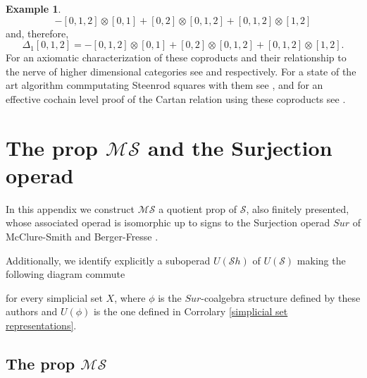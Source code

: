 \documentclass{amsart}
\renewcommand{\S}{\mathcal{S}}
\newcommand{\MS}{\mathcal{MS}}
\newcommand{\Sh}{\mathcal{S}h}
\newcommand{\F}{\mathbb{F}}
\newcommand{\chains}{\mathrm{C}_\bullet}
\newcommand{\tensor}{\otimes}
\newcommand{\End}{\mathrm{End}}
\theoremstyle{definition}
\newtheorem{example}[theorem]{Example}
\begin{document}
\begin{example}
		$$-[0,1,2]\tensor[0,1]+[0,2]\tensor[0,1,2]+[0,1,2]\tensor[1,2]$$
		and, therefore,
		$$\Delta_1[0,1,2]=-[0,1,2]\tensor[0,1]+[0,2]\tensor[0,1,2]+[0,1,2]\tensor[1,2].$$
		For an axiomatic characterization of these coproducts and their relationship to the nerve of higher dimensional categories see \cite{medina2018axiomatic} and \cite{medina2019globular} respectively. For a state of the art algorithm commputating Steenrod squares with them see \cite{medina2018persistence}, and for an effective cochain level proof of the Cartan relation using these coproducts see \cite{medina2019effective}.
	\end{example}
	
	\appendix
	
	\section{The prop $\MS$ and the Surjection operad}
	
	In this appendix we construct $\MS$ a quotient prop of $\S$, also finitely presented, whose associated operad is isomorphic up to signs to the Surjection operad $Sur$ of McClure-Smith \cite{mcclure2003multivariable} and Berger-Fresse \cite{berger2004combinatorial}.
	
	Additionally, we identify explicitly a suboperad $U(\Sh)$ of $U(\S)$ making the following diagram commute
	\begin{center}
	\end{center}
	for every simplicial set $X$, where $\phi$ is the $Sur$-coalgebra structure defined by these authors and $U(\phi)$ is the one defined in Corrolary \ref{simplicial set representations}.
	
	\subsection{The prop $\MS$}
	
\end{document}
